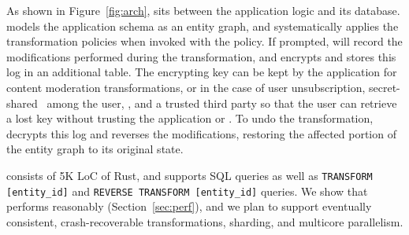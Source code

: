 As shown in Figure~\ref{fig:arch}, \sys sits between the application logic and its database. \sys
models the application schema as an entity graph, and systematically applies the transformation
policies when invoked with the policy. 
If prompted, \sys will record the modifications performed during the transformation, and encrypts and
stores this log in an additional table. The encrypting key can be kept by the application for \eg content
moderation transformations, or in the case of user unsubscription, secret-shared~\cite{secretsharing}
among the user, \sys, and a trusted third party so that the user can retrieve a lost key without
trusting the application or \sys. To undo the transformation, \sys decrypts this log and reverses the
modifications, restoring the affected portion of the entity graph to its original state.

\sys consists of 5K LoC of Rust, and supports SQL queries as well as \texttt{TRANSFORM
[entity\_id]} and \texttt{REVERSE TRANSFORM [entity\_id]} queries.
We show that \sys performs reasonably (Section~\ref{sec:perf}), and we plan to support eventually
consistent, crash-recoverable transformations, sharding, and multicore parallelism.



